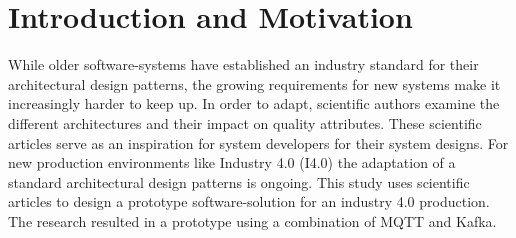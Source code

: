 \section{Introduction and Motivation}
While older software-systems have established an industry standard for their architectural design patterns, the growing requirements for new systems make it increasingly harder to keep up. In order to adapt, scientific authors examine the different architectures and their impact on quality attributes. These scientific articles serve as an inspiration for system developers for their system designs. For new production environments like Industry 4.0 (I4.0) the adaptation of a standard architectural design patterns is ongoing. This study uses scientific articles to design a prototype software-solution for an industry 4.0 production. The research resulted in a prototype using a combination of MQTT and Kafka.

